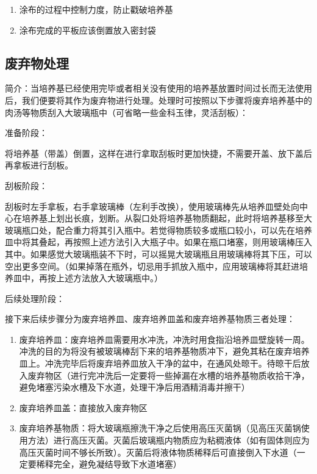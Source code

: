 \documentclass[
]{book}
\providecommand{\tightlist}{%
  \setlength{\itemsep}{0pt}\setlength{\parskip}{0pt}}
\begin{document}
\begin{enumerate}
\def\labelenumi{\arabic{enumi}.}
\tightlist
\item
  涂布的过程中控制力度，防止戳破培养基
\item
  涂布完成的平板应该倒置放入密封袋
\end{enumerate}

\hypertarget{ux5e9fux5f03ux7269ux5904ux7406}{%
\subsection{废弃物处理}\label{ux5e9fux5f03ux7269ux5904ux7406}}

简介：当培养基已经使用完毕或者相关没有使用的培养基放置时间过长而无法使用后，我们便要将其作为废弃物进行处理。处理时可按照以下步骤将废弃培养基中的肉汤等物质刮入大玻璃瓶中（可省略一些金科玉律，灵活刮板）：

准备阶段：

将培养基（带盖）倒置，这样在进行拿取刮板时更加快捷，不需要开盖、放下盖后再拿板进行刮板。

刮板阶段：

刮板时左手拿板，右手拿玻璃棒（左利手改换），使用玻璃棒先从培养皿壁处向中心在培养基上划出长痕，划断。从裂口处将培养基物质翻起，此时将培养基移至大玻璃瓶口处，配合重力将其引入瓶中。若觉得物质较多或瓶口较小，可以先在培养皿中将其叠起，再按照上述方法引入大瓶子中。如果在瓶口堵塞，则用玻璃棒压入其中。如果感觉大玻璃瓶装不下时，可以摇晃大玻璃瓶且用玻璃棒将其下压，可以空出更多空间。（如果掉落在瓶外，切忌用手抓放入瓶中，应用玻璃棒将其赶进培养皿中，再按上述方法放入大玻璃瓶中。）

后续处理阶段：

接下来后续步骤分为废弃培养皿、废弃培养皿盖和废弃培养基物质三者处理：

\begin{enumerate}
\def\labelenumi{\arabic{enumi}.}
\tightlist
\item
  废弃培养皿：废弃培养皿需要用水冲洗，冲洗时用食指沿培养皿壁旋转一周。冲洗的目的为将没有被玻璃棒刮下来的培养基物质冲下，避免其粘在废弃培养皿上。冲洗完毕后将废弃培养皿放入干净的盆中，在通风处晾干。待晾干后放入废弃物区（进行完冲洗后一定要将一些掉漏在水槽的培养基物质收拾干净，避免堵塞污染水槽及下水道，处理干净后用酒精消毒并擦干）
\item
  废弃培养皿盖：直接放入废弃物区
\item
  废弃培养基物质：将大玻璃瓶擦洗干净之后使用高压灭菌锅（见高压灭菌锅使用方法）进行高压灭菌。灭菌后玻璃瓶内物质应为粘稠液体（如有固体则应为高压灭菌时间不够长所致）。灭菌后将液体物质稀释后可直接倒入下水道（一定要稀释完全，避免凝结导致下水道堵塞）
\end{enumerate}
\end{document}
